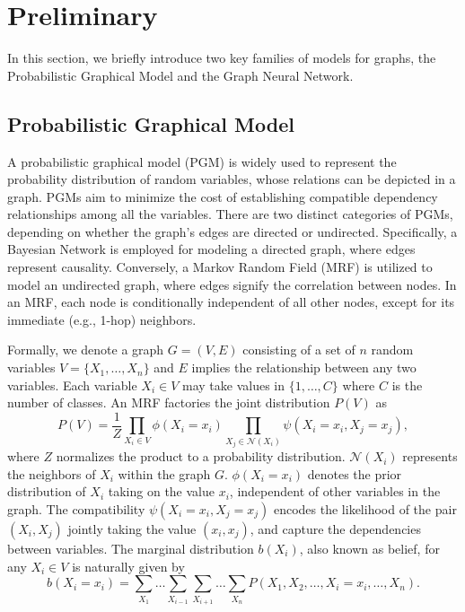 \section{Preliminary}
\label{sec:preliminary}
In this section, we briefly introduce two key families of models for graphs, the Probabilistic Graphical Model and the Graph Neural Network.

\subsection{Probabilistic Graphical Model}
A probabilistic graphical model (PGM) \cite{bishop2006pattern,jordan2004graphical} is widely used to represent the probability distribution of random variables, whose relations can be depicted in a graph.
PGMs aim to minimize the cost of establishing compatible dependency relationships among all the variables. 
There are two distinct categories of PGMs, depending on whether the graph's edges are directed or undirected. 
Specifically, a Bayesian Network is employed for modeling a directed graph, where edges represent causality. 
Conversely, a Markov Random Field (MRF) is utilized to model an undirected graph, where edges signify the correlation between nodes. 
In an MRF, each node is conditionally independent of all other nodes, except for its immediate (e.g., 1-hop) neighbors.

Formally, 
we denote a graph $G=(V,E)$ consisting of a set of $n$ random variables $V=\{ X_1, \dots, X_n \}$ and $E$ implies the relationship between any two variables. 
Each variable $X_i \in V$ may take values in $\{1,\dots, C\}$ where $C$ is the number of classes.
An MRF factories the joint distribution $P(V)$ as 
\begin{equation}
\label{eq:pgm_joint}
    P(V)=\frac{1}{Z}\prod_{X_i\in V} \phi(X_i=x_i) \prod_{X_j\in \mathcal{N}(X_i)}\psi(X_i=x_i, X_j=x_j),
\end{equation}
where $Z$ normalizes the product to a probability distribution.
$\mathcal{N}(X_i)$ represents the neighbors of $X_i$ within the graph $G$.
$\phi(X_i=x_i)$ denotes the prior distribution of $X_i$ taking on the value $x_i$, independent of other variables in the graph.
The compatibility $\psi(X_i=x_i, X_j=x_j)$ encodes the likelihood of the pair
$(X_i, X_j)$ jointly taking the value $(x_i, x_j)$,
and capture the dependencies between variables.
The marginal distribution $b(X_i)$, also known as belief, for any $X_i \in V$ is naturally given by
\begin{equation}
\label{eq:pgm_margin}
    b(X_i=x_i) = \sum_{X_1} \dots \sum_{X_{i-1}} \sum_{X_{i+1}} \dots \sum_{X_n} P(X_1, X_2, \dots, X_i=x_i, \dots, X_n).
\end{equation}

